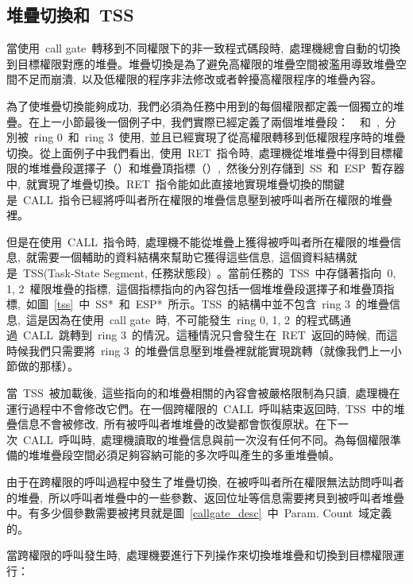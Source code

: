 \subsection{堆疊切換和~TSS}

當使用~call gate~轉移到不同權限下的非一致程式碼段時,~處理機總會自動的切換到目標權限對應的堆疊。堆疊切換是為了避免高權限的堆疊空間被濫用導致堆疊空間不足而崩潰,~以及低權限的程序非法修改或者幹擾高權限程序的堆疊內容。

為了使堆疊切換能夠成功,~我們必須為任務中用到的每個權限都定義一個獨立的堆疊。在上一小節最後一個例子中,~我們實際已經定義了兩個堆堆疊段：~~和~,~分別被~ring 0~和~ring 3~使用,~並且已經實現了從高權限轉移到低權限程序時的堆疊切換。從上面例子中我們看出,~使用~RET~指令時,~處理機從堆堆疊中得到目標權限的堆堆疊段選擇子（）和堆疊頂指標（）,~然後分別存儲到~SS~和~ESP~暫存器中,~就實現了堆疊切換。RET~指令能如此直接地實現堆疊切換的關鍵是~CALL~指令已經將呼叫者所在權限的堆疊信息壓到被呼叫者所在權限的堆疊裡。


但是在使用~CALL~指令時,~處理機不能從堆疊上獲得被呼叫者所在權限的堆疊信息,~就需要一個輔助的資料結構來幫助它獲得這些信息,~這個資料結構就是~TSS(Task-State Segment, 任務狀態段)~。當前任務的~TSS~中存儲著指向~0, 1, 2~權限堆疊的指標,~這個指標指向的內容包括一個堆堆疊段選擇子和堆疊頂指標,~如圖~\ref{tss}~中~SS*~和~ESP*~所示。TSS~的結構中並不包含~ring 3~的堆疊信息,~這是因為在使用~call gate~時,~不可能發生~ring 0, 1, 2~的程式碼通過~CALL~跳轉到~ring 3~的情況。這種情況只會發生在~RET~返回的時候,~而這時候我們只需要將~ring 3~的堆疊信息壓到堆疊裡就能實現跳轉（就像我們上一小節做的那樣）。

當~TSS~被加載後,~這些指向的和堆疊相關的內容會被嚴格限制為只讀,~處理機在運行過程中不會修改它們。在一個跨權限的~CALL~呼叫結束返回時,~TSS~中的堆疊信息不會被修改,~所有被呼叫者堆堆疊的改變都會恢復原狀。在下一次~CALL~呼叫時,~處理機讀取的堆疊信息與前一次沒有任何不同。為每個權限準備的堆堆疊段空間必須足夠容納可能的多次呼叫產生的多重堆疊幀。

由于在跨權限的呼叫過程中發生了堆疊切換,~在被呼叫者所在權限無法訪問呼叫者的堆疊,~所以呼叫者堆疊中的一些參數、返回位址等信息需要拷貝到被呼叫者堆疊中。有多少個參數需要被拷貝就是圖~\ref{callgate_desc}~中~Param. Count~域定義的。

當跨權限的呼叫發生時,~處理機要進行下列操作來切換堆堆疊和切換到目標權限運行：

